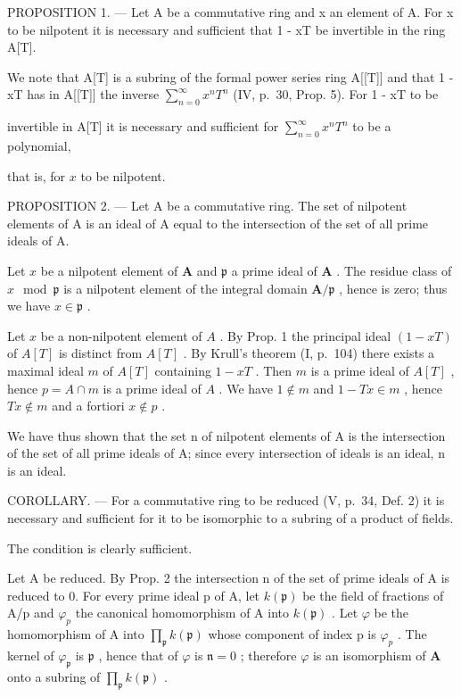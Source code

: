 PROPOSITION 1. --- Let A be a commutative ring and x an element of A. For x to be nilpotent it is necessary and sufficient that 1 - xT be invertible in the ring A{[}T{]}.

We note that A{[}T{]} is a subring of the formal power series ring A{[}{[}T{]}{]} and that 1 - xT has in A{[}{[}T{]}{]} the inverse \(\sum_{n=0}^{\infty} x^{n} T^{n}\) (IV, p.~30, Prop. 5). For 1 - xT to be

invertible in A{[}T{]} it is necessary and sufficient for \(\sum_{n=0}^{\infty} x^n T^n\) to be a polynomial,

that is, for \(x\) to be nilpotent.

PROPOSITION 2. --- Let A be a commutative ring. The set of nilpotent elements of A is an ideal of A equal to the intersection of the set of all prime ideals of A.

Let \(x\) be a nilpotent element of \(\mathbf{A}\) and \(\mathfrak{p}\) a prime ideal of \(\mathbf{A}\) . The residue class of \(x \mod \mathfrak{p}\) is a nilpotent element of the integral domain \(\mathbf{A} / \mathfrak{p}\) , hence is zero; thus we have \(x \in \mathfrak{p}\) .

Let \(x\) be a non-nilpotent element of \(A\) . By Prop. 1 the principal ideal \((1 - xT)\) of \(A[T]\) is distinct from \(A[T]\) . By Krull's theorem (I, p.~104) there exists a maximal ideal \(m\) of \(A[T]\) containing \(1 - xT\) . Then \(m\) is a prime ideal of \(A[T]\) , hence \(p = A \cap m\) is a prime ideal of \(A\) . We have \(1 \notin m\) and \(1 - Tx \in m\) , hence \(Tx \notin m\) and a fortiori \(x \notin p\) .

We have thus shown that the set n of nilpotent elements of A is the intersection of the set of all prime ideals of A; since every intersection of ideals is an ideal, n is an ideal.

COROLLARY. --- For a commutative ring to be reduced (V, p.~34, Def. 2) it is necessary and sufficient for it to be isomorphic to a subring of a product of fields.

The condition is clearly sufficient.

Let A be reduced. By Prop. 2 the intersection n of the set of prime ideals of A is reduced to 0. For every prime ideal p of A, let \(k(\mathfrak{p})\) be the field of fractions of A/p and \(\varphi_{p}\) the canonical homomorphism of A into \(k(\mathfrak{p})\) . Let \(\varphi\) be the homomorphism of A into \(\prod_{\mathfrak{p}} k(\mathfrak{p})\) whose component of index p is \(\varphi_{p}\) . The kernel of \(\varphi_{\mathfrak{p}}\) is \(\mathfrak{p}\) , hence that of \(\varphi\) is \(\mathfrak{n} = 0\) ; therefore \(\varphi\) is an isomorphism of \(\mathbf{A}\) onto a subring of \(\prod_{\mathfrak{p}} k(\mathfrak{p})\) .

